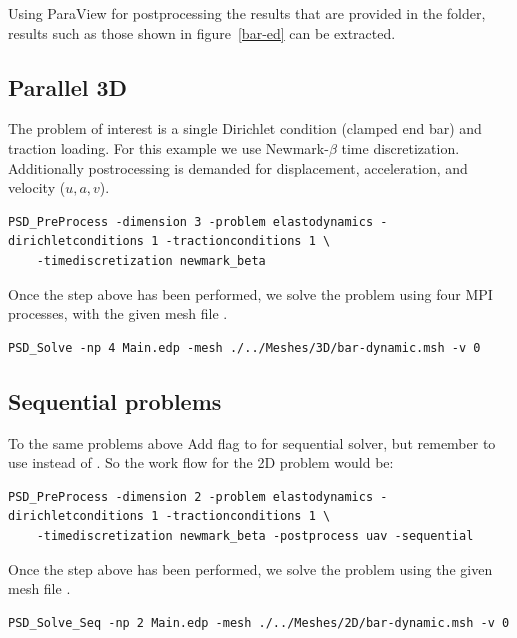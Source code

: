 Using ParaView for postprocessing the results that are provided in the  folder, results such as those shown in figure~\ref{bar-ed} can be extracted. 

\subsection{Parallel 3D}

The problem of interest is a single Dirichlet condition (clamped end bar) and traction loading. For this example we use Newmark-$\beta$ time discretization. Additionally postrocessing is demanded for displacement, acceleration, and velocity ($u,a,v$). 

\begin{lstlisting}[style=BashInputStyle]
	PSD_PreProcess -dimension 3 -problem elastodynamics -dirichletconditions 1 -tractionconditions 1 \
	-timediscretization newmark_beta
\end{lstlisting}

Once the step above has been performed, we solve the problem using four MPI processes, with the given mesh file . 

\begin{lstlisting}[style=BashInputStyle]
	PSD_Solve -np 4 Main.edp -mesh ./../Meshes/3D/bar-dynamic.msh -v 0
\end{lstlisting}


\subsection{Sequential problems}

To the same problems above Add  flag to  for sequential solver, but remember to use  instead of . So the work flow for the 2D problem would be:

\begin{lstlisting}[style=BashInputStyle]
	PSD_PreProcess -dimension 2 -problem elastodynamics -dirichletconditions 1 -tractionconditions 1 \
	-timediscretization newmark_beta -postprocess uav -sequential
\end{lstlisting}

Once the step above has been performed, we solve the problem using the given mesh file . 

\begin{lstlisting}[style=BashInputStyle]
	PSD_Solve_Seq -np 2 Main.edp -mesh ./../Meshes/2D/bar-dynamic.msh -v 0
\end{lstlisting}

